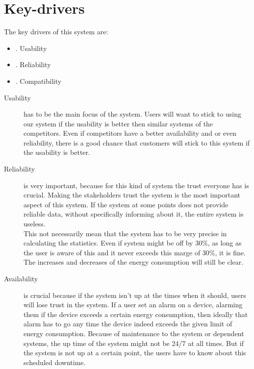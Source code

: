\section{Key-drivers}
The key drivers of this system are:
\begin{itemize}
	\item {}. Usability
	\item {}. Reliability
	\item {}. Compatibility
\end{itemize}


\begin{description}

\item [Usability] has to be the main focus of the system. Users will want to stick to using our system if the usability is better then similar systems of the competitors. Even if competitors have a better availability and or even reliability, there is a good chance that customers will stick to this system if the usability is better. 

\item [Reliability] is very important, because for this kind of system the trust everyone has is crucial. Making the stakeholders trust the system is the most important aspect of this system. If the system at some points does not provide reliable data, without specifically informing about it, the entire system is useless.\\
This not necessarily mean that the system has to be very precise in calculating the statistics. Even if system might be off by 30\%, as long as the user is aware of this and it never exceeds this marge of 30\%, it is fine. The increases and decreases of the energy consumption will still be clear.

\item [Availability] is crucial because if the system isn't up at the times when it should, users will lose trust in the system. If a user set an alarm on a device, alarming them if the device exceeds a certain energy consumption, then ideally that alarm has to go any time the device indeed exceeds the given limit of energy consumption. Because of maintenance to the system or dependent systems, the up time of the system might not be 24/7 at all times. But if the system is not up at a certain point, the users have to know about this scheduled downtime.

\end{description}